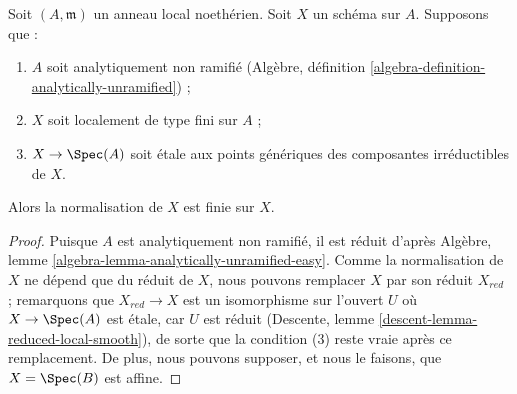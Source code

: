 \begin{lemma} \label{lemma-formally-unramified} Soit $(A, \mathfrak m)$ un anneau local noethérien. Soit $X$ un schéma sur $A$. Supposons que : \begin{enumerate} \item $A$ soit analytiquement non ramifié (Algèbre, définition \ref{algebra-definition-analytically-unramified}) ; \item $X$ soit localement de type fini sur $A$ ; \item $X \to \Spec(A)$ soit \'etale aux points génériques des composantes irréductibles de $X$. \end{enumerate} Alors la normalisation de $X$ est finie sur $X$. \end{lemma}

\begin{proof} Puisque $A$ est analytiquement non ramifié, il est réduit d'après Algèbre, lemme \ref{algebra-lemma-analytically-unramified-easy}. Comme la normalisation de $X$ ne dépend que du réduit de $X$, nous pouvons remplacer $X$ par son réduit $X_{red}$ ; remarquons que $X_{red} \to X$ est un isomorphisme sur l'ouvert $U$ où $X \to \Spec(A)$ est \'etale, car $U$ est réduit (Descente, lemme \ref{descent-lemma-reduced-local-smooth}), de sorte que la condition (3) reste vraie après ce remplacement. De plus, nous pouvons supposer, et nous le faisons, que $X = \Spec(B)$ est affine.


\end{proof}
